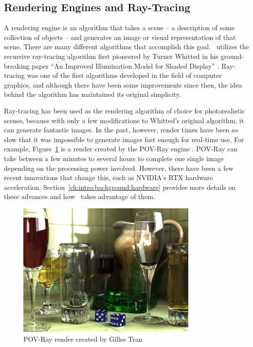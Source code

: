 \subsection{Rendering Engines and Ray-Tracing}
\label{ch:intro:overview:raytracing}

A rendering engine is an algorithm that takes a scene -- a description of some collection of objects -- and generates an image or visual representation of that scene.
There are many different algorithms that accomplish this goal.
\name\ utilizes the recursive ray-tracing algorithm first pioneered by Turner Whitted in his ground-breaking paper ``An Improved Illumination Model for Shaded Display'' \cite{whitted1980improved}.
Ray-tracing was one of the first algorithms developed in the field of computer graphics, and although there have been some improvements since then, the idea behind the algorithm has maintained its original simplicity.

Ray-tracing has been used as the rendering algorithm of choice for photorealistic scenes, because with only a few modifications to Whitted's original algorithm, it can generate fantastic images.
In the past, however, render times have been so slow that it was impossible to generate images fast enough for real-time use.
For example, Figure~\ref{fig:povray_render} is a render created by the POV-Ray engine \cite{povray}.
POV-Ray can take between a few minutes to several hours to complete one single image depending on the processing power involved.
However, there have been a few recent innovations that change this, such as NVIDIA's RTX hardware acceleration.
Section~\ref{ch:intro:background:hardware} provides more details on these advances and how \name\ takes advantage of them.

\begin{figure}[htb]
  \centering
  \includegraphics[width=0.8\textwidth]{resources/glasses_povray}
  \caption{POV-Ray render created by Gilles Tran \cite{povray2006render}}
  \label{fig:povray_render}
\end{figure}

